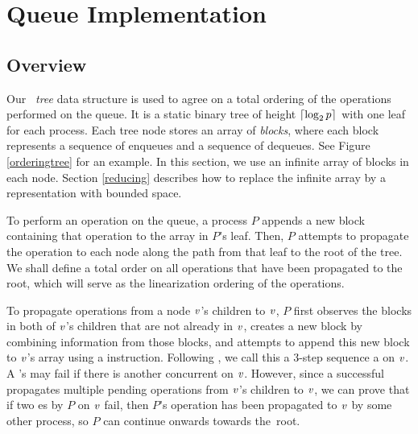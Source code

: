
\section{Queue Implementation} \label{DescriptQ}

\subsection{Overview}
Our \emph{\ordering\ tree} data structure is used to agree on a total ordering of the operations performed on the queue.
It is a static binary tree of height $\lceil \log_2 p \rceil$ with one leaf 
for each process. 
Each tree node  stores an array of \emph{blocks}, where each block represents a 
sequence of enqueues and a sequence of dequeues.
See Figure \ref{orderingtree} for an example.
In this section, we use an infinite array of blocks in each node.
Section \ref{reducing} describes how to replace the infinite array by a representation with bounded space.

To perform an operation on the queue, a process $P$ appends a new block containing that  
operation to the  array in $P$'s leaf.
Then, $P$ attempts to propagate the operation to each node along the path from that leaf to the root of the tree.
We shall define a total order on all operations that have been propagated to the root, which 
will serve as the linearization ordering of the operations.

To propagate operations from a node $\mbox{\textnormal{\textit{v}}}$'s children to $\mbox{\textnormal{\textit{v}}}$, $P$ first observes
the blocks in both of $\mbox{\textnormal{\textit{v}}}$'s children that are not already in $\mbox{\textnormal{\textit{v}}}$,
creates a new block by combining information from those blocks, and attempts to append this 
new block to $\mbox{\textnormal{\textit{v}}}$'s  array using a  instruction.
Following \cite{DBLP:conf/fsttcs/JayantiP05}, we call this a 3-step sequence a
 on $\mbox{\textnormal{\textit{v}}}$. %
A 's  may fail if there is another concurrent  on $\mbox{\textnormal{\textit{v}}}$.
However, since a successful  propagates multiple pending operations 
from $\mbox{\textnormal{\textit{v}}}$'s children to $\mbox{\textnormal{\textit{v}}}$,
we can prove that if two es by $P$ on $\mbox{\textnormal{\textit{v}}}$ fail,
then $P$'s operation has been propagated to $\mbox{\textnormal{\textit{v}}}$ by some other process, so $P$ can continue 
onwards towards the~root.

